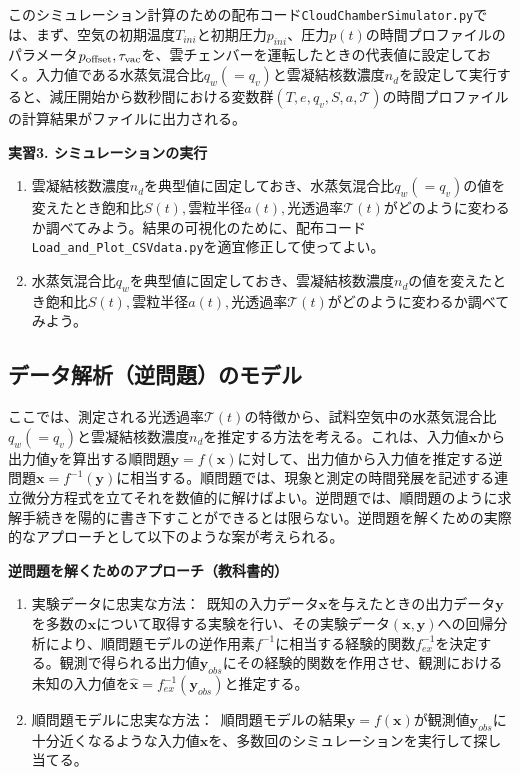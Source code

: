 \documentclass{jsarticle}
\begin{document}
このシミュレーション計算のための配布コード\verb|CloudChamberSimulator.py|では、まず、空気の初期温度$T_{ini}$と初期圧力$p_{ini}$、圧力$p(t)$の時間プロファイルのパラメータ$p_{\rm offset}, \tau_{\rm vac}$を、雲チェンバーを運転したときの代表値に設定しておく。入力値である水蒸気混合比$q_{w}(=q_{v})$と雲凝結核数濃度$n_{d}$を設定して実行すると、減圧開始から数秒間における変数群$(T,e,q_{v},S,a,\mathcal{T})$の時間プロファイルの計算結果がファイルに出力される。
\\
\begin{itembox}[l]{\bf{実習3. シミュレーションの実行}}
\begin{enumerate}
\item 雲凝結核数濃度$n_{d}$を典型値に固定しておき、水蒸気混合比$q_{w}(=q_{v})$の値を変えたとき$飽和比S(t),雲粒半径a(t),光透過率\mathcal{T}(t)$がどのように変わるか調べてみよう。結果の可視化のために、配布コード\verb|Load_and_Plot_CSVdata.py|を適宜修正して使ってよい。
\item 水蒸気混合比$q_{w}$を典型値に固定しておき、雲凝結核数濃度$n_{d}$の値を変えたとき$飽和比S(t),雲粒半径a(t),光透過率\mathcal{T}(t)$がどのように変わるか調べてみよう。
\end{enumerate}
\end{itembox}

\subsection{データ解析（逆問題）のモデル}
ここでは、測定される光透過率$\mathcal{T}(t)$の特徴から、試料空気中の水蒸気混合比$q_{w}(=q_{v})$と雲凝結核数濃度$n_{d}$を推定する方法を考える。これは、入力値$\bm{x}$から出力値$\bm{y}$を算出する順問題$\bm{y}=f(\bm{x})$に対して、出力値から入力値を推定する逆問題$\bm{x}=f^{-1}(\bm{y})$に相当する。順問題では、現象と測定の時間発展を記述する連立微分方程式を立てそれを数値的に解けばよい。逆問題では、順問題のように求解手続きを陽的に書き下すことができるとは限らない。逆問題を解くための実際的なアプローチとして以下のような案が考えられる。\\
\begin{itembox}[l]{\bf{逆問題を解くためのアプローチ（教科書的）}}
\begin{enumerate}
\item 実験データに忠実な方法：\, 既知の入力データ$\bm{x}$を与えたときの出力データ$\bm{y}$を多数の$\bm{x}$について取得する実験を行い、その実験データ$(\bm{x}, \bm{y})$への回帰分析により、順問題モデルの逆作用素$f^{-1}$に相当する経験的関数$f^{-1}_{ex}$を決定する。観測で得られる出力値$\bm{y}_{obs}$にその経験的関数を作用させ、観測における未知の入力値を$\bm{\hat{x}}=f^{-1}_{ex}(\bm{y}_{obs})$と推定する。
\item 順問題モデルに忠実な方法：\, 順問題モデルの結果$\bm{y}=f(\bm{x})$が観測値$\bm{y}_{obs}$に十分近くなるような入力値$\bm{x}$を、多数回のシミュレーションを実行して探し当てる。
\end{enumerate}
\end{itembox}
\end{document}
